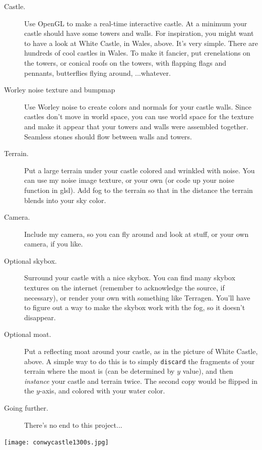 \documentclass{article}
\begin{document}
\begin{description}

\item[Castle.] Use OpenGL to make a real-time interactive castle.  At
  a minimum your castle should have some towers and walls.  For
  inspiration, you might want to have a look at White Castle, in
  Wales, above.  It's very simple.  There are hundreds of cool castles
  in Wales.  To make it fancier, put crenelations on the towers, or
  conical roofs on the towers, with flapping flags and pennants,
  butterflies flying around, ...whatever.

  \item[Worley noise texture and bumpmap] Use Worley noise to create
    colors and normals for your castle walls.  Since castles don't
    move in world space, you can use world space for the texture and
    make it appear that your towers and walls were assembled
    together.  Seamless stones should flow between walls and towers.

\item[Terrain.] Put a large terrain under your castle
  colored and wrinkled with noise.  You can use my noise image
  texture, or your own (or code up your noise function in glsl).
  Add fog to the terrain so that in the distance the terrain blends
  into your sky color.

\item[Camera.]  Include my camera, so you can fly around and look at
  stuff, or your own camera, if you like.

\item[Optional skybox.] Surround your castle with a nice skybox.  You can
  find many skybox textures on the internet (remember to acknowledge
  the source, if necessary), or render your own with something like
  Terragen.  You'll have to figure out a way to make the skybox work
  with the fog, so it doesn't disappear.  
  
\item[Optional moat.]  Put a reflecting moat around your castle, as in
  the picture of White Castle, above.  A simple way to do this is to
  simply {\tt discard} the fragments of your terrain where the moat is
  (can be determined by $y$ value), and then {\em instance} your
  castle and terrain twice.  The second copy would be flipped in the
  $y$-axis, and colored with your water color.

  \item[Going further.] There's no end to this
  project...

\end{description}

\centerline{\texttt{[image: conwycastle1300s.jpg]}}
\end{document}
